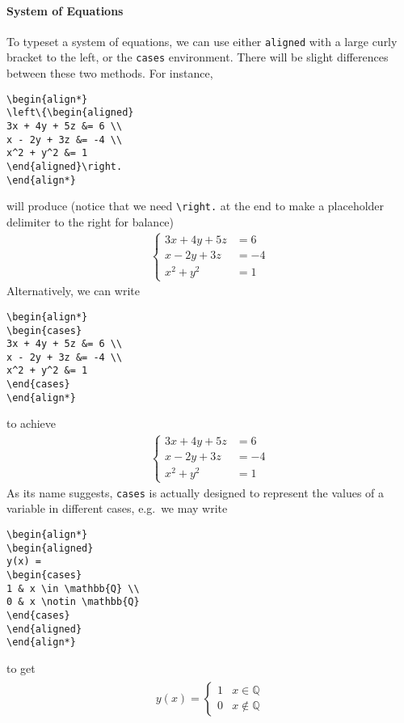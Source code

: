 \paragraph{System of Equations}
To typeset a system of equations, we can use either \texttt{aligned} with a large curly bracket to the left, or the \texttt{cases} environment. There will be slight differences between these two methods. For instance,
\begin{lstlisting}
\begin{align*}
\left\{\begin{aligned}
3x + 4y + 5z &= 6 \\
x - 2y + 3z &= -4 \\
x^2 + y^2 &= 1
\end{aligned}\right.
\end{align*}
\end{lstlisting}
will produce (notice that we need \texttt{\textbackslash right.} at the end to make a placeholder delimiter to the right for balance)
\begin{align*}
\left\{\begin{aligned}
3x + 4y + 5z &= 6 \\
x - 2y + 3z &= -4 \\
x^2 + y^2 &= 1
\end{aligned}\right.
\end{align*}
Alternatively, we can write
\begin{lstlisting}
\begin{align*}
\begin{cases}
3x + 4y + 5z &= 6 \\
x - 2y + 3z &= -4 \\
x^2 + y^2 &= 1
\end{cases}
\end{align*}
\end{lstlisting}
to achieve
\begin{align*}
\begin{cases}
3x + 4y + 5z &= 6 \\
x - 2y + 3z &= -4 \\
x^2 + y^2 &= 1
\end{cases}
\end{align*}
As its name suggests, \verb|cases| is actually designed to represent the values of a variable in different cases, e.g.\ we may write
\begin{lstlisting}
\begin{align*}
\begin{aligned}
y(x) = 
\begin{cases}
1 & x \in \mathbb{Q} \\
0 & x \notin \mathbb{Q}
\end{cases}
\end{aligned}
\end{align*}
\end{lstlisting}
to get
\begin{align*}
\begin{aligned}
y(x) = 
\begin{cases}
1 & x \in \mathbb{Q} \\
0 & x \notin \mathbb{Q}
\end{cases}
\end{aligned}
\end{align*}

